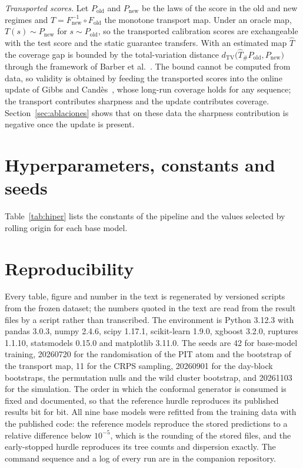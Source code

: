 \emph{Transported scores.} Let $P_{\mathrm{old}}$ and $P_{\mathrm{new}}$ be the laws of the score in the old and new regimes and $T=F_{\mathrm{new}}^{-1}\circ F_{\mathrm{old}}$ the monotone transport map. Under an oracle map, $T(s)\sim P_{\mathrm{new}}$ for $s\sim P_{\mathrm{old}}$, so the transported calibration scores are exchangeable with the test score and the static guarantee transfers. With an estimated map $\hat T$ the coverage gap is bounded by the total-variation distance $d_{\mathrm{TV}}\big(\hat T_\# P_{\mathrm{old}},P_{\mathrm{new}}\big)$ through the framework of Barber et al.~\cite{barber2023}. The bound cannot be computed from data, so validity is obtained by feeding the transported scores into the online update of Gibbs and Cand\`es~\cite{gibbs2021}, whose long-run coverage holds for any sequence; the transport contributes sharpness and the update contributes coverage. Section~\ref{sec:ablaciones} shows that on these data the sharpness contribution is negative once the update is present.

\section{Hyperparameters, constants and seeds}
\label{app:hiper}

Table~\ref{tab:hiper} lists the constants of the pipeline and the values selected by rolling origin for each base model.



\section{Reproducibility}
\label{app:repro}

Every table, figure and number in the text is regenerated by versioned scripts from the frozen dataset; the numbers quoted in the text are read from the result files by a script rather than transcribed. The environment is Python 3.12.3 with pandas 3.0.3, numpy 2.4.6, scipy 1.17.1, scikit-learn 1.9.0, xgboost 3.2.0, ruptures 1.1.10, statsmodels 0.15.0 and matplotlib 3.11.0. The seeds are 42 for base-model training, 20260720 for the randomisation of the PIT atom and the bootstrap of the transport map, 11 for the CRPS sampling, 20260901 for the day-block bootstraps, the permutation nulls and the wild cluster bootstrap, and 20261103 for the simulation. The order in which the conformal generator is consumed is fixed and documented, so that the reference hurdle reproduces its published results bit for bit. All nine base models were refitted from the training data with the published code: the reference models reproduce the stored predictions to a relative difference below $10^{-5}$, which is the rounding of the stored files, and the early-stopped hurdle reproduces its tree counts and dispersion exactly. The command sequence and a log of every run are in the companion repository.

